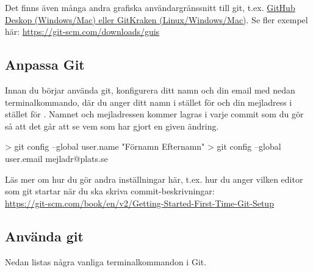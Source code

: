 Det finns även många andra grafiska användargränssnitt till git, t.ex. \href{https://desktop.github.com/}{GitHub Deskop (Windows/Mac) eller \href{https://www.gitkraken.com/}{GitKraken (Linux/Windows/Mac)}}. Se fler exempel här: \url{https://git-scm.com/downloads/guis} 



\subsection{Anpassa Git}

Innan du börjar använda git, konfigurera ditt namn och din email med nedan terminalkommando, där du anger ditt namn i stället för  och din mejladress i stället för . Namnet och mejladressen kommer lagras i varje commit som du gör så att det går att se vem som har gjort en given ändring.
\begin{REPLnonum}
> git config --global user.name "Förnamn Efternamn"
> git config --global user.email mejladr@plats.se
\end{REPLnonum}

Läs mer om hur du gör andra inställningar här, t.ex. hur du anger vilken editor som git startar när du ska skriva commit-beskrivningar: \\ \url{https://git-scm.com/book/en/v2/Getting-Started-First-Time-Git-Setup}


\subsection{Använda git}

Nedan listas några vanliga terminalkommandon i Git.

